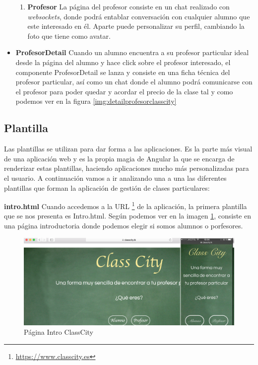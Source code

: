 \begin{itemize}
\begin{enumerate}
\item \textbf{Profesor } La página del profesor consiste en un chat realizado con \textit{websockets}, donde podrá entablar conversación con cualquier alumno que este interesado en él. Aparte puede personalizar su perfil, cambiando la foto que tiene como avatar.
\end{enumerate}

\item \textbf{ProfesorDetail} Cuando un alumno encuentra a su profesor particular ideal desde la página del alumno y hace click sobre el profesor interesado, el componente ProfesorDetail se lanza y consiste en una ficha técnica del profesor particular, así como un chat donde el alumno podrá comunicarse con el profesor para poder quedar y acordar el precio de la clase tal y como podemos ver en la figura \ref{img:detailprofesorclasscity}

\end{itemize}

\subsection{Plantilla }

Las plantillas se utilizan para dar forma a las aplicaciones. Es la parte más visual de una aplicación web y es la propia magia de Angular la que se encarga de renderizar estas plantillas, haciendo aplicaciones mucho más personalizadas para el usuario. A continuación vamos a ir analizando una a una las diferentes plantillas que forman la aplicación de gestión de clases particulares:

\textbf {intro.html} Cuando accedemos a la URL \footnote{\url{https://www.classcity.es}} de la aplicación, la primera plantilla que se nos presenta es Intro.html. Según podemos ver en la imagen  \ref{img:introclasscity}, consiste en una página introductoria donde podemos elegir si somos alumnos o porfesores.

\begin{figure}[!h]
    \centering
    \includegraphics[width=140mm]{img/templates/intro.png}
    \caption{Página Intro ClassCity}
    \label{img:introclasscity}
\end{figure}


